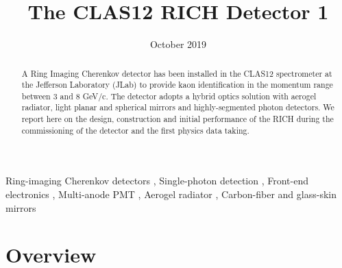 \documentclass[5p,times,twocolumn]{elsarticle}
\title{The CLAS12 RICH Detector 1}
\author{ }
\date{October 2019}
\begin{document}

\begin{abstract}
A Ring Imaging Cherenkov detector has been installed in the CLAS12 spectrometer at the
Jefferson Laboratory (JLab) to provide kaon identification in the momentum range between 3 and 8 GeV/c. The detector adopts a hybrid optics solution with aerogel radiator, light planar and spherical mirrors and highly-segmented photon detectors. We report here on the design, construction and initial performance of the RICH during the commissioning of the detector and the first physics data taking. 
\end{abstract}

\begin{keyword}
Ring-imaging Cherenkov detectors
\sep
Single-photon detection
\sep
Front-end electronics
\sep
Multi-anode PMT
\sep
Aerogel radiator
\sep
Carbon-fiber and glass-skin mirrors
\end{keyword}

\maketitle


\section{Overview}
\end{document}
